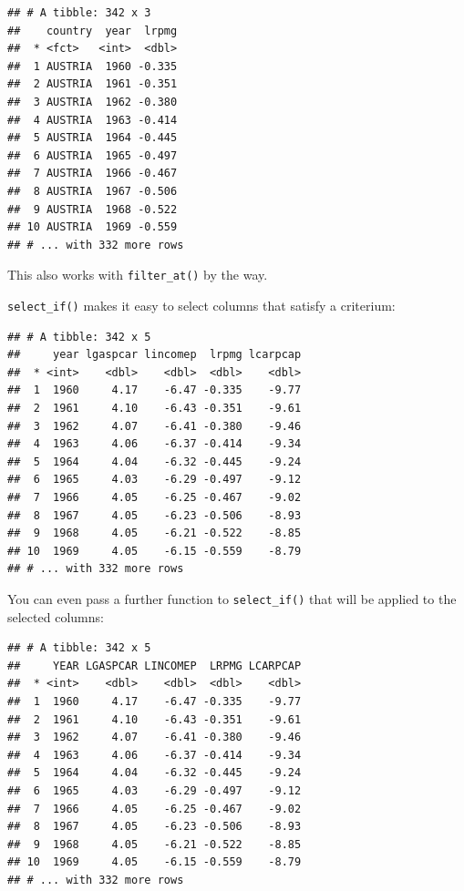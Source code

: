 \documentclass[]{gitbook}
\newenvironment{Shaded}{\begin{snugshade}}{\end{snugshade}}
\newcommand{\KeywordTok}[1]{\textcolor[rgb]{0.13,0.29,0.53}{\textbf{#1}}}
\newcommand{\NormalTok}[1]{#1}
\newcommand{\OperatorTok}[1]{\textcolor[rgb]{0.81,0.36,0.00}{\textbf{#1}}}
\newcommand{\StringTok}[1]{\textcolor[rgb]{0.31,0.60,0.02}{#1}}
\theoremstyle{definition}
\theoremstyle{definition}
\theoremstyle{definition}
\theoremstyle{remark}
\begin{document}
\begin{verbatim}
## # A tibble: 342 x 3
##    country  year  lrpmg
##  * <fct>   <int>  <dbl>
##  1 AUSTRIA  1960 -0.335
##  2 AUSTRIA  1961 -0.351
##  3 AUSTRIA  1962 -0.380
##  4 AUSTRIA  1963 -0.414
##  5 AUSTRIA  1964 -0.445
##  6 AUSTRIA  1965 -0.497
##  7 AUSTRIA  1966 -0.467
##  8 AUSTRIA  1967 -0.506
##  9 AUSTRIA  1968 -0.522
## 10 AUSTRIA  1969 -0.559
## # ... with 332 more rows
\end{verbatim}

This also works with \texttt{filter\_at()} by the way.

\texttt{select\_if()} makes it easy to select columns that satisfy a
criterium:

\begin{Shaded}
\end{Shaded}

\begin{verbatim}
## # A tibble: 342 x 5
##     year lgaspcar lincomep  lrpmg lcarpcap
##  * <int>    <dbl>    <dbl>  <dbl>    <dbl>
##  1  1960     4.17    -6.47 -0.335    -9.77
##  2  1961     4.10    -6.43 -0.351    -9.61
##  3  1962     4.07    -6.41 -0.380    -9.46
##  4  1963     4.06    -6.37 -0.414    -9.34
##  5  1964     4.04    -6.32 -0.445    -9.24
##  6  1965     4.03    -6.29 -0.497    -9.12
##  7  1966     4.05    -6.25 -0.467    -9.02
##  8  1967     4.05    -6.23 -0.506    -8.93
##  9  1968     4.05    -6.21 -0.522    -8.85
## 10  1969     4.05    -6.15 -0.559    -8.79
## # ... with 332 more rows
\end{verbatim}

You can even pass a further function to \texttt{select\_if()} that will
be applied to the selected columns:

\begin{Shaded}
\end{Shaded}

\begin{verbatim}
## # A tibble: 342 x 5
##     YEAR LGASPCAR LINCOMEP  LRPMG LCARPCAP
##  * <int>    <dbl>    <dbl>  <dbl>    <dbl>
##  1  1960     4.17    -6.47 -0.335    -9.77
##  2  1961     4.10    -6.43 -0.351    -9.61
##  3  1962     4.07    -6.41 -0.380    -9.46
##  4  1963     4.06    -6.37 -0.414    -9.34
##  5  1964     4.04    -6.32 -0.445    -9.24
##  6  1965     4.03    -6.29 -0.497    -9.12
##  7  1966     4.05    -6.25 -0.467    -9.02
##  8  1967     4.05    -6.23 -0.506    -8.93
##  9  1968     4.05    -6.21 -0.522    -8.85
## 10  1969     4.05    -6.15 -0.559    -8.79
## # ... with 332 more rows
\end{verbatim}
\end{document}
